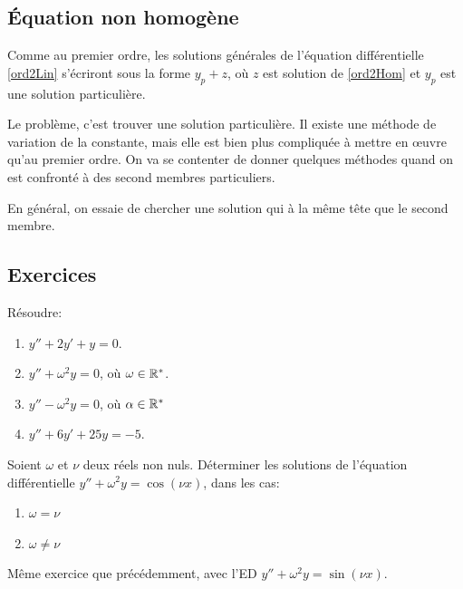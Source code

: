 \documentclass[../main.tex]{subfiles}
\begin{document}
\subsection{Équation non homogène}

Comme au premier ordre, les solutions générales de l'équation différentielle \eqref{ord2Lin} s'écriront sous la forme $y_p+z$, où $z$ est solution de \eqref{ord2Hom} et $y_p$ est une solution particulière.

Le problème, c'est trouver une solution particulière. Il existe une méthode de variation de la constante, mais elle est bien plus compliquée à mettre en œuvre qu'au premier ordre. On va se contenter de donner quelques méthodes quand on est confronté à des second membres particuliers.

En général, on essaie de chercher une solution qui à la même tête que le second membre.

\subsection{Exercices}

\begin{exo}Résoudre:
	\begin{multicols}{2}
		\begin{enumerate}
			\item $y'' + 2y' + y = 0$.
			\item $y'' + \omega^2y = 0$, où $\omega\in\mathbb R^*$.
			\item $y'' - \omega^2y = 0$, où $\alpha\in\mathbb R^*$
			\item $y'' + 6y' + 25y = -5$.
		\end{enumerate}
	\end{multicols}
\end{exo}

\begin{exo}
	Soient $\omega$ et $\nu$ deux réels non nuls. Déterminer les solutions de l'équation différentielle $y''+\omega^2y = \cos(\nu x)$, dans les cas:\begin{enumerate}
		\item $\omega=\nu$
		\item $\omega\neq\nu$
	\end{enumerate}
\end{exo}

\begin{exo}
	Même exercice que précédemment, avec l'ED $y'' + \omega^2y = \sin(\nu x)$.
\end{exo}
\end{document}
